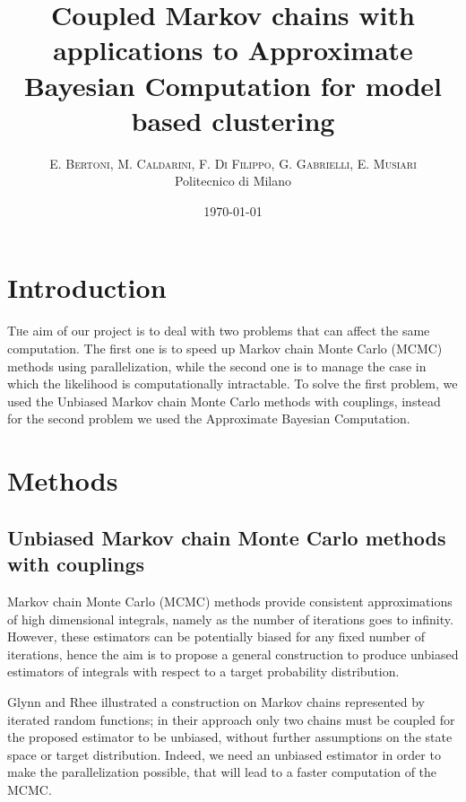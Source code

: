 \documentclass {article}
\title{Coupled Markov chains with applications to Approximate Bayesian Computation for model based clustering} %
\author{%
\textsc{E. Bertoni, M. Caldarini, F. Di Filippo, G. Gabrielli, E. Musiari} \\[1ex] %
\normalsize Politecnico di Milano \\ %
}
\date{\today} %
\begin{document}
\maketitle


\section{Introduction}

\lettrine[nindent=0em,lines=3]{T}he aim of our project is to deal with two problems that can affect the same computation. The first one is to speed up Markov chain Monte Carlo (MCMC) methods using parallelization, while the second one is to manage the case in which the likelihood is computationally intractable. To solve the first problem, we used the Unbiased Markov chain Monte Carlo methods with couplings, instead for the second problem we used the Approximate Bayesian Computation.


\section{Methods}

%

\subsection{Unbiased Markov chain Monte Carlo methods with couplings}


Markov chain Monte Carlo (MCMC) methods provide consistent approximations of high dimensional integrals, namely as the number of iterations goes to infinity. However, these estimators can be potentially biased for any fixed number of iterations, hence the aim is to propose a general construction to produce unbiased estimators of integrals with respect to a target probability distribution. 

Glynn and Rhee \cite{glynn2014exact} illustrated a construction on Markov chains represented by iterated random functions; in their approach only two chains must be coupled for the proposed estimator to be unbiased, without further assumptions on the state space or target distribution. 
Indeed, we need an unbiased estimator in order to make the parallelization possible, that will lead to a faster computation of the MCMC.
\end{document}
